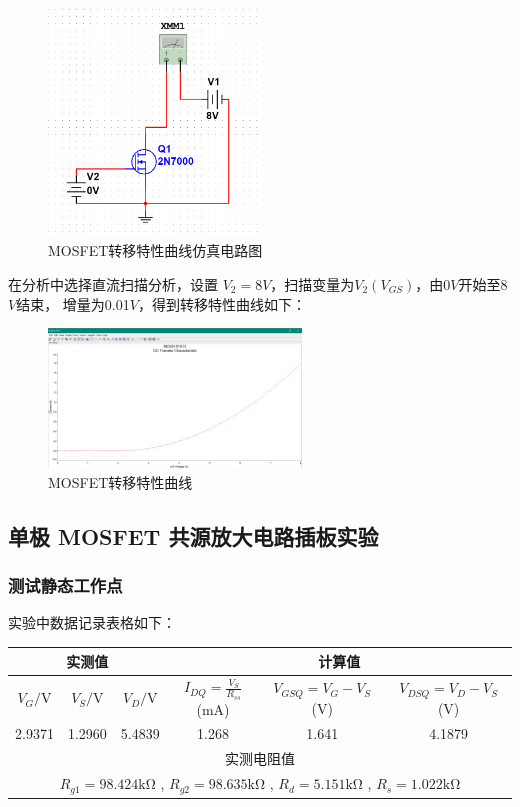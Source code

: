 \documentclass[a4paper,11pt,UTF8]{article}
\numberwithin{equation}{subsection}
\begin{document}
\begin{figure}[H]
	\centering
	\includegraphics[width=0.5\textwidth]{2.15.png}	
	\caption{MOSFET转移特性曲线仿真电路图}
\end{figure}

在分析中选择直流扫描分析，设置 $V_{2} = 8V$，扫描变量为$V_2(V_{GS})$，由0$V$开始至8$V$结束，
增量为0.01$V$，得到转移特性曲线如下：

\begin{figure}
	\centering
	\includegraphics[width=0.6\textwidth]{2.16.png}
	\caption{MOSFET转移特性曲线}
\end{figure}

\subsection{单极 MOSFET 共源放大电路插板实验}

\subsubsection{测试静态工作点}
实验中数据记录表格如下：

\begin{table}[H]
	\centering
	\begin{tabular}{|c|c|c|c|c|c|}
	\hline
	\multicolumn{3}{|c|}{实测值} & \multicolumn{3}{c|}{计算值} \\
	\hline
	\( V_G/\mathrm{V} \) & \( V_S/\mathrm{V} \) & \( V_D/\mathrm{V} \) & \( I_{DQ} = \frac{V_S}{R_{ss}} \) (mA) & \( V_{GSQ} = V_G - V_S \) (V) & \( V_{DSQ} = V_D - V_S \) (V) \\
	\hline
	2.9371 & 1.2960 & 5.4839 & 1.268 & 1.641 & 4.1879 \\
	\hline
	\multicolumn{6}{|c|}{实测电阻值} \\
	\hline
	\multicolumn{6}{|c|}{\( R_{g1} = 98.424\mathrm{k\Omega} \) , \( R_{g2} = 98.635\mathrm{k\Omega}\) , \( R_d = 5.151\mathrm{k\Omega}\) , \( R_s = 1.022\mathrm{k\Omega}\)}\\
	\hline
	\end{tabular}
\end{table}
\end{document}
